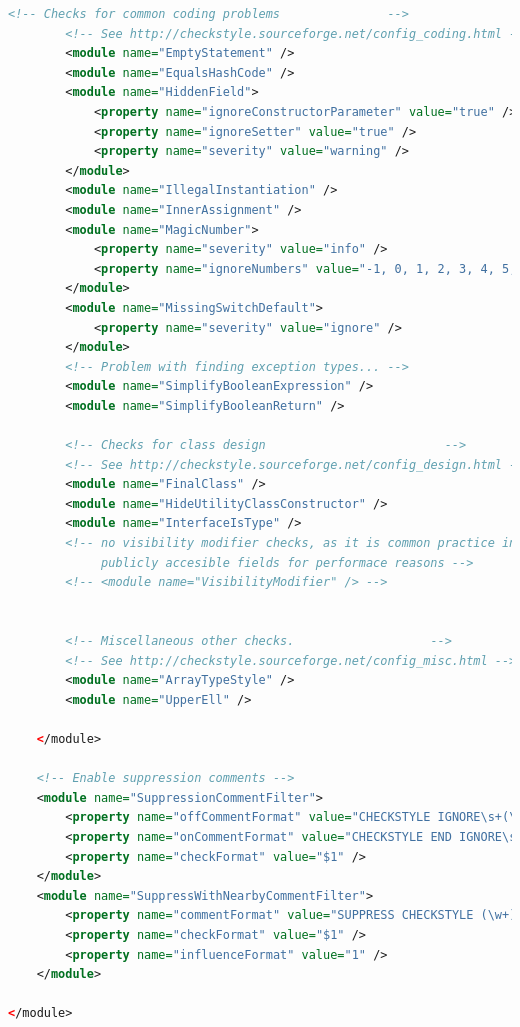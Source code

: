 \begin{lstlisting}[language=XML]
        <!-- Checks for common coding problems               -->
        <!-- See http://checkstyle.sourceforge.net/config_coding.html -->
        <module name="EmptyStatement" />
        <module name="EqualsHashCode" />
        <module name="HiddenField">
            <property name="ignoreConstructorParameter" value="true" />
            <property name="ignoreSetter" value="true" />
            <property name="severity" value="warning" />
        </module>
        <module name="IllegalInstantiation" />
        <module name="InnerAssignment" />
        <module name="MagicNumber">
            <property name="severity" value="info" />
            <property name="ignoreNumbers" value="-1, 0, 1, 2, 3, 4, 5, 8, 10, 12, 16, 24, 30, 32, 60, 64, 100, 120, 128, 180, 256, 360, 1000" />
        </module>
        <module name="MissingSwitchDefault">
            <property name="severity" value="ignore" />
        </module>
        <!-- Problem with finding exception types... -->
        <module name="SimplifyBooleanExpression" />
        <module name="SimplifyBooleanReturn" />

        <!-- Checks for class design                         -->
        <!-- See http://checkstyle.sourceforge.net/config_design.html -->
        <module name="FinalClass" />
        <module name="HideUtilityClassConstructor" />
        <module name="InterfaceIsType" />
        <!-- no visibility modifier checks, as it is common practice in Android to have certain
             publicly accesible fields for performace reasons -->
        <!-- <module name="VisibilityModifier" /> -->


        <!-- Miscellaneous other checks.                   -->
        <!-- See http://checkstyle.sourceforge.net/config_misc.html -->
        <module name="ArrayTypeStyle" />
        <module name="UpperEll" />

    </module>

    <!-- Enable suppression comments -->
    <module name="SuppressionCommentFilter">
        <property name="offCommentFormat" value="CHECKSTYLE IGNORE\s+(\S+)" />
        <property name="onCommentFormat" value="CHECKSTYLE END IGNORE\s+(\S+)" />
        <property name="checkFormat" value="$1" />
    </module>
    <module name="SuppressWithNearbyCommentFilter">
        <property name="commentFormat" value="SUPPRESS CHECKSTYLE (\w+)" />
        <property name="checkFormat" value="$1" />
        <property name="influenceFormat" value="1" />
    </module>

</module>
\end{lstlisting}


